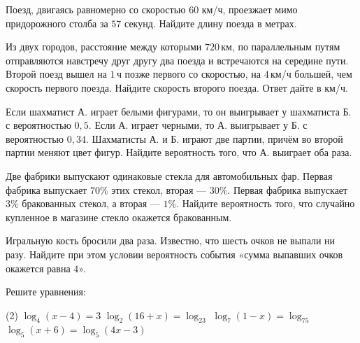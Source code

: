 \begin{homework}[number=1]
	\begin{listofex}
		\item Поезд, двигаясь равномерно со скоростью \( 60 \) км/ч, проезжает мимо придорожного столба за \( 57 \) секунд. Найдите длину поезда в метрах.
		\item Из двух городов, расстояние между которыми \( 720 \) км, по параллельным путям отправляются навстречу друг другу два поезда и встречаются на середине пути. Второй поезд вышел на \( 1 \) ч позже первого со скоростью, на \( 4 \) км/ч большей, чем скорость первого поезда. Найдите скорость второго поезда. Ответ дайте в км/ч.
		\item Если шахматист А. играет белыми фигурами, то он выигрывает у шахматиста Б. с вероятностью \( 0,5 \). Если А. играет черными, то А. выигрывает у Б. с вероятностью \( 0,34 \). Шахматисты А. и Б. играют две партии, причём во второй партии меняют цвет фигур. Найдите вероятность того, что А. выиграет оба раза.
		\item Две фабрики выпускают одинаковые стекла для автомобильных фар. Первая фабрика выпускает \( 70\% \) этих стекол, вторая --- \( 30\% \). Первая фабрика выпускает \( 3\% \) бракованных стекол, а вторая --- \( 1\% \). Найдите вероятность того, что случайно купленное в магазине стекло окажется бракованным.
		\item Игральную кость бросили два раза. Известно, что шесть очков не выпали ни разу. Найдите при этом условии вероятность события «сумма выпавших очков окажется равна \( 4 \)».
		\item Решите уравнения:
		\begin{tasks}(2)
			\task \( \log_4(x-4)=3 \)
			\task \( \log_2(16+x)=\log_23 \)
			\task \( \log_7(1-x)=\log_75 \)
			\task \( \log_5(x+6)=\log_5(4x-3) \)
		\end{tasks}
	\end{listofex}
\end{homework}

